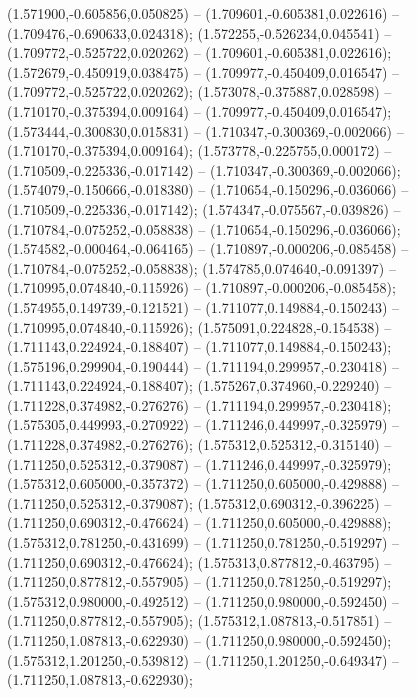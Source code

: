  (1.571900,-0.605856,0.050825) -- (1.709601,-0.605381,0.022616) -- (1.709476,-0.690633,0.024318);
 (1.572255,-0.526234,0.045541) -- (1.709772,-0.525722,0.020262) -- (1.709601,-0.605381,0.022616);
 (1.572679,-0.450919,0.038475) -- (1.709977,-0.450409,0.016547) -- (1.709772,-0.525722,0.020262);
 (1.573078,-0.375887,0.028598) -- (1.710170,-0.375394,0.009164) -- (1.709977,-0.450409,0.016547);
 (1.573444,-0.300830,0.015831) -- (1.710347,-0.300369,-0.002066) -- (1.710170,-0.375394,0.009164);
 (1.573778,-0.225755,0.000172) -- (1.710509,-0.225336,-0.017142) -- (1.710347,-0.300369,-0.002066);
 (1.574079,-0.150666,-0.018380) -- (1.710654,-0.150296,-0.036066) -- (1.710509,-0.225336,-0.017142);
 (1.574347,-0.075567,-0.039826) -- (1.710784,-0.075252,-0.058838) -- (1.710654,-0.150296,-0.036066);
 (1.574582,-0.000464,-0.064165) -- (1.710897,-0.000206,-0.085458) -- (1.710784,-0.075252,-0.058838);
 (1.574785,0.074640,-0.091397) -- (1.710995,0.074840,-0.115926) -- (1.710897,-0.000206,-0.085458);
 (1.574955,0.149739,-0.121521) -- (1.711077,0.149884,-0.150243) -- (1.710995,0.074840,-0.115926);
 (1.575091,0.224828,-0.154538) -- (1.711143,0.224924,-0.188407) -- (1.711077,0.149884,-0.150243);
 (1.575196,0.299904,-0.190444) -- (1.711194,0.299957,-0.230418) -- (1.711143,0.224924,-0.188407);
 (1.575267,0.374960,-0.229240) -- (1.711228,0.374982,-0.276276) -- (1.711194,0.299957,-0.230418);
 (1.575305,0.449993,-0.270922) -- (1.711246,0.449997,-0.325979) -- (1.711228,0.374982,-0.276276);
 (1.575312,0.525312,-0.315140) -- (1.711250,0.525312,-0.379087) -- (1.711246,0.449997,-0.325979);
 (1.575312,0.605000,-0.357372) -- (1.711250,0.605000,-0.429888) -- (1.711250,0.525312,-0.379087);
 (1.575312,0.690312,-0.396225) -- (1.711250,0.690312,-0.476624) -- (1.711250,0.605000,-0.429888);
 (1.575312,0.781250,-0.431699) -- (1.711250,0.781250,-0.519297) -- (1.711250,0.690312,-0.476624);
 (1.575313,0.877812,-0.463795) -- (1.711250,0.877812,-0.557905) -- (1.711250,0.781250,-0.519297);
 (1.575312,0.980000,-0.492512) -- (1.711250,0.980000,-0.592450) -- (1.711250,0.877812,-0.557905);
 (1.575312,1.087813,-0.517851) -- (1.711250,1.087813,-0.622930) -- (1.711250,0.980000,-0.592450);
 (1.575312,1.201250,-0.539812) -- (1.711250,1.201250,-0.649347) -- (1.711250,1.087813,-0.622930);
